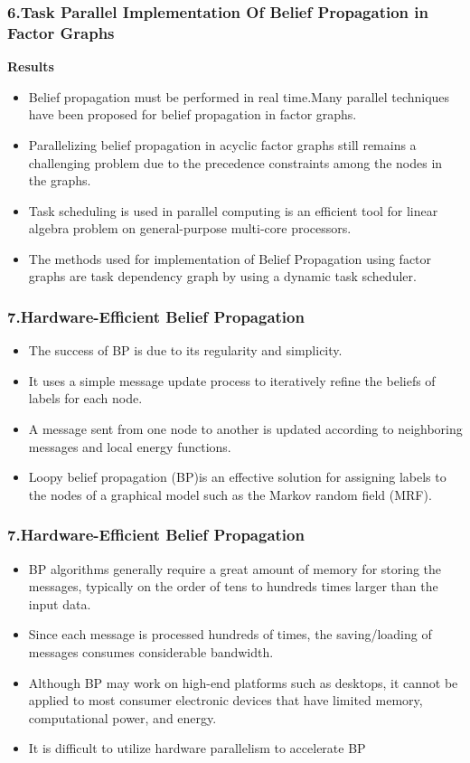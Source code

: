 \documentclass{beamer}
\begin{document}
\begin{frame}
\frametitle{\textbf{6.Task Parallel Implementation Of Belief Propagation in Factor Graphs}}
\textbf{Results}
\begin{itemize}
\item Belief propagation must be performed in real time.Many parallel techniques have been proposed for belief propagation in factor graphs.
\item Parallelizing belief propagation in acyclic factor graphs still remains a challenging problem due to the precedence constraints among the nodes in the graphs.
\item Task scheduling is used in parallel computing is an efficient tool  for linear algebra problem on general-purpose multi-core processors.
\item The  methods used for implementation of Belief Propagation using factor graphs are task dependency graph  by using a dynamic task scheduler.
\end{itemize}
\end{frame}

\begin{frame}
\frametitle{\textbf{7.Hardware-Efficient Belief Propagation}}
\begin{itemize}
\item The success of BP is due to its regularity and simplicity.
\item It uses a simple message update process to iteratively refine the beliefs of labels for each node.
\item A message sent from one node to another is updated according to neighboring messages and local energy functions.
\item Loopy belief  propagation (BP)is an effective solution for assigning labels to the nodes of a graphical model such as the Markov random field (MRF).
\end{itemize}
\end{frame}

\begin{frame}
\frametitle{\textbf{7.Hardware-Efficient Belief Propagation}}
\begin{itemize}
\item BP algorithms generally require a great amount of memory for storing the messages, typically on the order of tens to hundreds times larger than the input data.
\item Since each message is processed hundreds of times, the saving/loading of  messages consumes considerable bandwidth.
\item Although BP may work on high-end platforms such as desktops, it cannot be applied to most consumer electronic devices that have limited memory, computational power, and energy.
\item It is  difficult to  utilize  hardware  parallelism  to accelerate BP
\end{itemize}
\end{frame}
\end{document}
